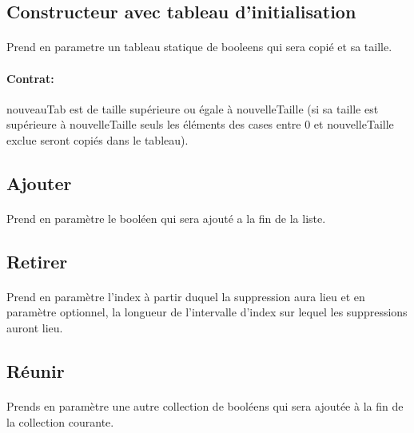 \documentclass[a4paper, 12pts]{article}
\begin{document}
\subsection{Constructeur avec tableau d'initialisation}

\paragraph{}
Prend en parametre un tableau statique de booleens qui sera copié et sa taille.
\paragraph{Contrat:}
nouveauTab est de taille supérieure ou égale à nouvelleTaille (si sa taille est supérieure à nouvelleTaille seuls les éléments des cases entre 0 et nouvelleTaille exclue seront copiés dans le tableau).

\subsection{Ajouter}

\paragraph{}
Prend en paramètre le booléen qui sera ajouté a la fin de la liste.

\subsection{Retirer}

\paragraph{}
Prend en paramètre l'index à partir duquel la suppression aura lieu et en paramètre optionnel, la longueur de l'intervalle d'index sur lequel les suppressions auront lieu.

\subsection{Réunir}

\paragraph{}
Prends en paramètre une autre collection de booléens qui sera ajoutée à la fin de la collection courante.
\end{document}
